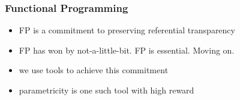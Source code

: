 \begin{frame}
\frametitle{Functional Programming}
\begin{itemize}
  \item<1> FP is a commitment to preserving referential transparency
  \item<2> FP has won by not-a-little-bit. FP is essential. Moving on.
  \item<3> we use tools to achieve this commitment
  \item<4> parametricity is one such tool with high reward
\end{itemize}
\end{frame}
